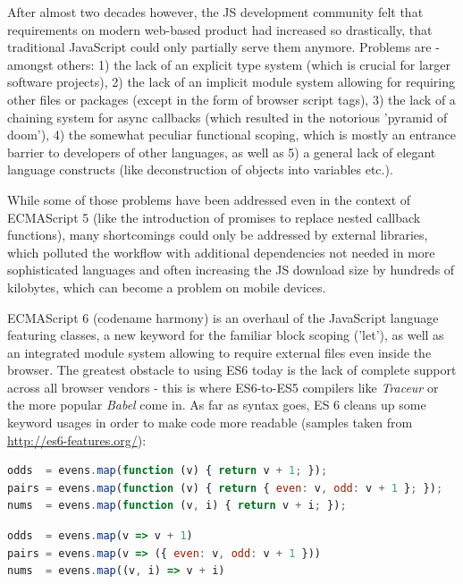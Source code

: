 	After almost two decades however, the JS development community felt that requirements on modern web-based product had increased so drastically, that traditional JavaScript could only partially serve them anymore. Problems are - amongst others: 1) the lack of an explicit type system (which is crucial for larger software projects), 2) the lack of an implicit module system allowing for requiring other files or packages (except in the form of browser script tags), 3) the lack of a chaining system for async callbacks (which resulted in the notorious 'pyramid of doom'), 4) the somewhat peculiar functional scoping, which is mostly an entrance barrier to developers of other languages, as well as 5) a general lack of elegant language constructs (like deconstruction of objects into variables etc.).
	
	While some of those problems have been addressed even in the context of ECMAScript 5 (like the introduction of promises to replace nested callback functions), many shortcomings could only be addressed by external libraries, which polluted the workflow with additional dependencies not needed in more sophisticated languages and often increasing the JS download size by hundreds of kilobytes, which can become a problem on mobile devices.
	
	ECMAScript 6 (codename harmony) is an overhaul of the JavaScript language featuring classes, a new keyword for the familiar block scoping ('let'), as well as an integrated module system allowing to require external files even inside the browser. The greatest obstacle to using ES6 today is the lack of complete support across all browser vendors - this is where ES6-to-ES5 compilers like \textit{Traceur} or the more popular \textit{Babel} come in. As far as syntax goes, ES 6 cleans up some keyword usages in order to make code more readable (samples taken from \url{http://es6-features.org/}):
	
	
	\begin{lstlisting}[caption={ECMAScript 5 (usually referred to as 'JavaScript') version of functional programming using the natively built-in mapping function.}, label={fig:ECMAScript5_mapping}, language=JavaScript]
odds  = evens.map(function (v) { return v + 1; });
pairs = evens.map(function (v) { return { even: v, odd: v + 1 }; });
nums  = evens.map(function (v, i) { return v + i; });
	\end{lstlisting}
	
	
	\begin{lstlisting}[caption={ECMAScript 6 equivalent to the above code.}, label={fig:ECMAScript6_mapping}, language=JavaScript]
odds  = evens.map(v => v + 1)
pairs = evens.map(v => ({ even: v, odd: v + 1 }))
nums  = evens.map((v, i) => v + i)
	\end{lstlisting}
	
